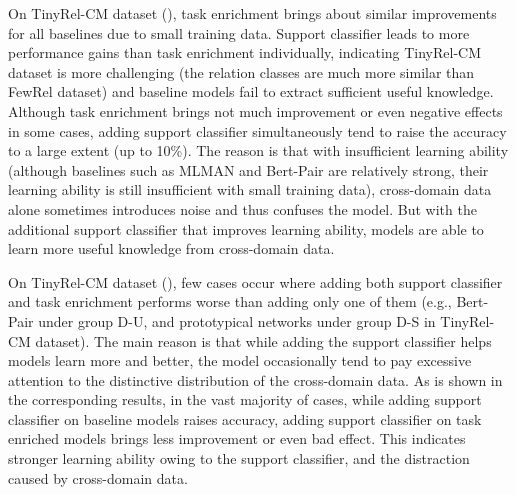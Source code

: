On TinyRel-CM dataset (), %
task enrichment brings about similar improvements for all baselines due to small training data. Support classifier leads to more performance gains than task enrichment individually,
indicating TinyRel-CM dataset is more challenging (the relation classes are much more similar than FewRel dataset) and baseline models fail to extract sufficient useful knowledge.
Although task enrichment brings not much improvement or even negative effects in some cases, adding support classifier simultaneously tend to raise the accuracy to a large extent (up to 10\%). 
The reason is that with insufficient learning ability %
(although baselines such as MLMAN and Bert-Pair are relatively strong, their learning ability is still insufficient with small training data),
cross-domain data alone sometimes introduces
noise and thus confuses the model. But with the additional support classifier
that improves learning ability, models are able to learn more useful
knowledge from cross-domain data.

On %
TinyRel-CM dataset (), few cases occur where adding both support classifier and task enrichment performs worse than adding only one of them
(e.g., Bert-Pair under group D-U, and prototypical networks under group D-S in TinyRel-CM dataset).
The main reason is that while adding the support classifier helps models learn more and better, the model occasionally tend to pay excessive attention to the distinctive distribution of the cross-domain data.
As is shown in the corresponding results, in the vast majority of cases, while adding support classifier on baseline models raises accuracy, adding support classifier on task enriched models brings less improvement or even bad effect. This indicates stronger learning ability owing to the support classifier, and the distraction caused by cross-domain data.

